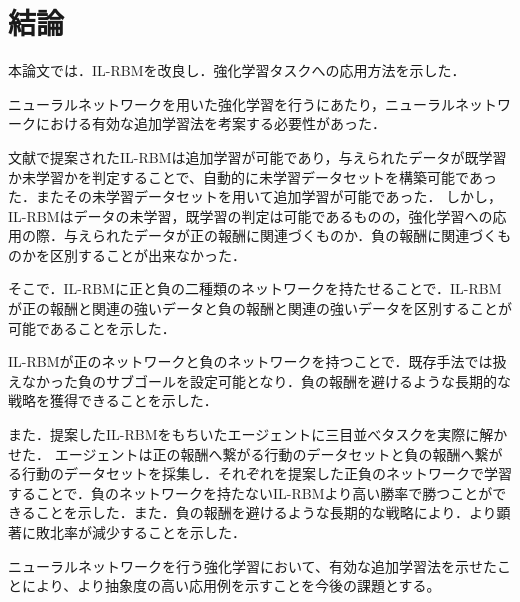 \chapter{結論}
本論文では．IL-RBMを改良し．強化学習タスクへの応用方法を示した．

ニューラルネットワークを用いた強化学習を行うにあたり，ニューラルネットワークにおける有効な追加学習法を考案する必要性があった．

文献\cite{osawa}で提案されたIL-RBMは追加学習が可能であり，与えられたデータが既学習か未学習かを判定することで、自動的に未学習データセットを構築可能であった．またその未学習データセットを用いて追加学習が可能であった．
しかし，IL-RBMはデータの未学習，既学習の判定は可能であるものの，強化学習への応用の際．与えられたデータが正の報酬に関連づくものか．負の報酬に関連づくものかを区別することが出来なかった．

そこで．IL-RBMに正と負の二種類のネットワークを持たせることで．IL-RBMが正の報酬と関連の強いデータと負の報酬と関連の強いデータを区別することが可能であることを示した．

IL-RBMが正のネットワークと負のネットワークを持つことで．既存手法では扱えなかった負のサブゴールを設定可能となり．負の報酬を避けるような長期的な戦略を獲得できることを示した．

また．提案したIL-RBMをもちいたエージェントに三目並べタスクを実際に解かせた．
エージェントは正の報酬へ繋がる行動のデータセットと負の報酬へ繋がる行動のデータセットを採集し．それぞれを提案した正負のネットワークで学習することで．負のネットワークを持たないIL-RBMより高い勝率で勝つことができることを示した．また．負の報酬を避けるような長期的な戦略により．より顕著に敗北率が減少することを示した．

ニューラルネットワークを行う強化学習において、有効な追加学習法を示せたことにより、より抽象度の高い応用例を示すことを今後の課題とする。
